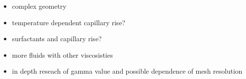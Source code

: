 \begin{itemize}
    \item complex geometry
    \item temperature dependent capillary rise?
    \item surfactants and capillary rise?
    \item more fluids with other viscosisties
    \item in depth reseach of gamma value and possible dependence of mesh resolution
\end{itemize}